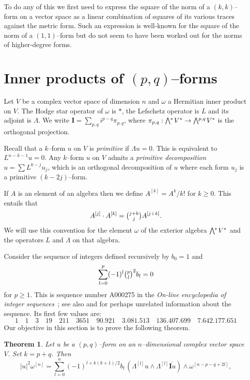 \documentclass[11pt,a4paper]{amsart}
\def\^#1{^{[#1]}}
\def\bw#1{\bigwedge{}^{\mkern-5mu #1}\mkern2mu}
\def\I{\mathbf{I}}
\newtheorem{theo}{Theorem}[section]
\theoremstyle{definition}
\theoremstyle{remark}
\numberwithin{equation}{section}
\begin{document}
To do any of this we first need to express the square of the norm of a
$(k,k)$--form on a vector space as a linear combination of squares of its
various traces against the metric form. Such an expression is well-known
for the square of the norm of a $(1,1)$--form but do not seem to have been
worked out for the norms of higher-degree forms.




\section{Inner products of $(p,q)$--forms}



Let $V$ be a complex vector space of dimension $n$ and $\omega$ a Hermitian
inner product on $V$. The Hodge star operator of $\omega$ is $*$,
the Lefschetz operator is $L$ and its adjoint is $\Lambda$. We write
$\I = \sum_{p,q} i^{p-q} \pi_{p,q}$, where $\pi_{p,q} : \bw{*} V^* \to
\bw{p,q} V^*$ is the orthogonal projection.

Recall that a $k$--form $u$ on $V$ is \emph{primitive} if $\Lambda u = 0$.
This is equivalent to $L^{n-k-1}u = 0$. Any $k$--form $u$ on $V$ admits a
\emph{primitive decomposition} $u = \sum L^{k-j} u_j$, which is an
orthogonal decomposition of $u$ where each form $u_j$ is a primitive
$(k-2j)$--form.

If $A$ is an element of an algebra then we define $A\^k = A^k / k!$ for $k
\geq 0$. This entails that
$$
A\^j \cdot A\^k = \tbinom{j+k}{j} A\^{j+k}.
$$
We will use this convention for the element $\omega$ of the exterior
algebra $\bw{*} V^*$ and the operators $L$ and $\Lambda$ on that
algebra.



Consider the sequence of integers defined recursively by $b_0 = 1$ and
\begin{equation}
\label{bezel}
\sum_{l=0}^{p} (-1)^{l} \tbinom{p}{l}^2 b_l = 0
\end{equation}
for $p \geq 1$. This is sequence number A000275 in the \textsl{On-line
encyclopedia of integer sequences}~\cite{OEIS}; see also \cite{Carlitz}
and \cite{Riordan} for perhaps unrelated information about the sequence.
Its first few values are: 
$$
1 \quad 1 \quad 3 \quad 19 \quad 211 \quad 3651 \quad
90.921 \quad 3.081.513 \quad 136.407.699 \quad 7.642.177.651
$$
Our objective in this section is to prove the following theorem.


\begin{theo}
    \label{thm:norm}
Let $u$ be a $(p,q)$--form on an $n$--dimensional complex vector
space $V$. Set $k = p+q$. Then
$$
    \lvert u \rvert^2 \omega\^n
    = \sum_{l=0}^n (-1)^{l+k(k+1)/2} b_l \, 
    (\Lambda\^l u \wedge \Lambda\^l \overline{\I u})
    \wedge \omega\^{n-p-q+2l},
$$
\end{theo}
\end{document}
